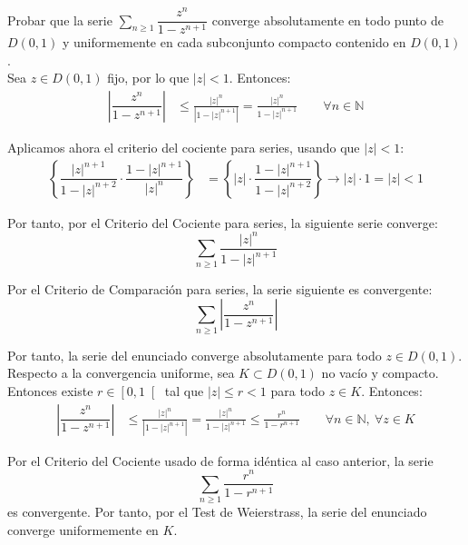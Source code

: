 \documentclass[12pt]{article}
\begin{document}
    \begin{ejercicio}[2.5 puntos] Probar que la serie $\displaystyle \sum\limits_{n\geq 1} \dfrac{z^n}{1-z^{n+1}}$ converge absolutamente en todo punto de $D(0, 1)$ y uniformemente en cada subconjunto compacto contenido en $D(0, 1)$.\\

        Sea $z \in D(0, 1)$ fijo, por lo que $|z|<1$. Entonces:
        \begin{align*}
            \left|\dfrac{z^n}{1-z^{n+1}}\right| &\leq \frac{|z|^n}{\left|1 - |z|^{n+1}\right|} = \frac{|z|^n}{1 - |z|^{n+1}} \qquad \forall n \in \mathbb{N}
        \end{align*}

        Aplicamos ahora el criterio del cociente para series, usando que $|z|<1$:
        \begin{align*}
            \left\{\dfrac{|z|^{n+1}}{1 - |z|^{n+2}} \cdot \dfrac{1 - |z|^{n+1}}{|z|^n} \right\}&= \left\{|z| \cdot \dfrac{1 - |z|^{n+1}}{1 - |z|^{n+2}}\right\} \to |z|\cdot 1 = |z|<1
        \end{align*}

        Por tanto, por el Criterio del Cociente para series, la siguiente serie converge:
        \begin{equation*}
            \sum_{n \geq 1} \frac{|z|^n}{1 - |z|^{n+1}}
        \end{equation*}

        Por el Criterio de Comparación para series, la serie siguiente es convergente:
        \begin{equation*}
            \sum_{n \geq 1} \left|\dfrac{z^n}{1-z^{n+1}}\right|
        \end{equation*}

        Por tanto, la serie del enunciado converge absolutamente para todo $z \in D(0, 1)$.\\

        Respecto a la convergencia uniforme, sea $K\subset D(0, 1)$ no vacío y compacto. Entonces existe $r \in \left[0,1\right[$ tal que $|z|\leq r<1$ para todo $z \in K$. Entonces:
        \begin{align*}
            \left|\dfrac{z^n}{1-z^{n+1}}\right| &\leq \frac{|z|^n}{\left|1 - |z|^{n+1}\right|} = \frac{|z|^n}{1 - |z|^{n+1}}\leq \frac{r^n}{1 - r^{n+1}} \qquad \forall n \in \mathbb{N},~\forall z \in K
        \end{align*}

        Por el Criterio del Cociente usado de forma idéntica al caso anterior, la serie
        \begin{equation*}
            \sum_{n \geq 1} \frac{r^n}{1 - r^{n+1}}
        \end{equation*}
        es convergente. Por tanto, por el Test de Weierstrass, la serie del enunciado converge uniformemente en $K$.
    \end{ejercicio}
\end{document}
